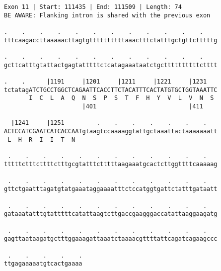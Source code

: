 \documentclass{article}
\begin{document}
\begin{Verbatim}
Exon 11 | Start: 111435 | End: 111509 | Length: 74
BE AWARE: Flanking intron is shared with the previous exon
 
.    .    .    .    .    .    .    .    .    .    .    .    
tttcaagaccttaaaaacttagtgttttttttttaaactttctatttgctgttctttttg
  
.    .    .    .    .    .    .    .    .    .    .    .    
gcttcatttgtattactgagtatttttctcatagaaataatctgcttttttttttctttt
  
.    .      |1191     |1201     |1211     |1221     |1231   
tctatagATCTGCCTGGCTCAGAATTCACCTTCTACATTTCACTATGTGCTGGTAAATTC
       I  C  L  A  Q  N  S  P  S  T  F  H  Y  V  L  V  N  S 
                      |401                          |411    
  
  |1241     |1251         .    .    .    .    .    .    .   
ACTCCATCGAATCATCACCAATgtaagtccaaaaggtattgctaaattactaaaaaaatt
 L  H  R  I  I  T  N                                        
  
 .    .    .    .    .    .    .    .    .    .    .    .   
tttttctttcttttctttgcgtatttctttttaagaaatgcactcttggttttcaaaaag
  
 .    .    .    .    .    .    .    .    .    .    .    .   
gttctgaatttagatgtatgaaataggaaaatttctccatggtgattctatttgataatt
  
 .    .    .    .    .    .    .    .    .    .    .    .   
gataaatatttgtatttttcatattaagtcttgaccgaagggaccatattaaggaagatg
  
 .    .    .    .    .    .    .    .    .    .    .    .   
gagttaataagatgctttggaaagattaaatctaaaacgttttattcagatcagaagccc
  
 .    .    .    .    .
ttgagaaaaatgtcactgaaaa
\end{Verbatim}
\newpage
\end{document}
